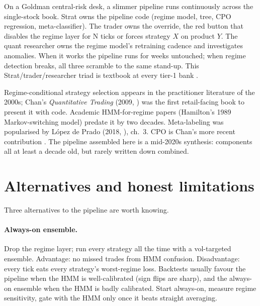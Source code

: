 \begin{gsbox}
On a Goldman central-risk desk, a slimmer pipeline runs
continuously across the single-stock book. Strat owns the pipeline
code (regime model, tree, CPO regression, meta-classifier). The
trader owns the override, the red button that disables the
regime layer for N ticks or forces strategy $X$ on product $Y$. The
quant researcher owns the regime model's retraining cadence and
investigates anomalies. When it works the pipeline runs for weeks
untouched; when regime detection breaks, all three scramble to the
same stand-up. This Strat/trader/researcher triad is textbook at
every tier-1 bank \citeChanQT{}.
\end{gsbox}

\begin{historybox}
Regime-conditional strategy selection appears in the practitioner
literature of the 2000s; Chan's \emph{Quantitative Trading} (2009,
\citeChanQT{}) was the first retail-facing book to present it with
code. Academic HMM-for-regime papers (Hamilton's 1989
Markov-switching model) predate it by two decades. Meta-labeling
was popularised by L\'opez de Prado (2018, \citeAFML{}), ch.\ 3.
CPO is Chan's more recent contribution \citep{chan2020cpo}. The
pipeline assembled here is a mid-2020s synthesis: components
all at least a decade old, but rarely written down combined.
\end{historybox}

\section{Alternatives and honest limitations}
\label{sec:wsw_alternatives}

Three alternatives to the pipeline are worth knowing.

\paragraph{Always-on ensemble.} Drop the regime layer; run every
strategy all the time with a vol-targeted ensemble. Advantage: no
missed trades from HMM confusion. Disadvantage: every tick eats
every strategy's worst-regime loss. Backtests usually favour the
pipeline when the HMM is well-calibrated (sign flips are sharp),
and the always-on ensemble when the HMM is badly calibrated. Start
always-on, measure regime sensitivity, gate with the HMM only once
it beats straight averaging.

